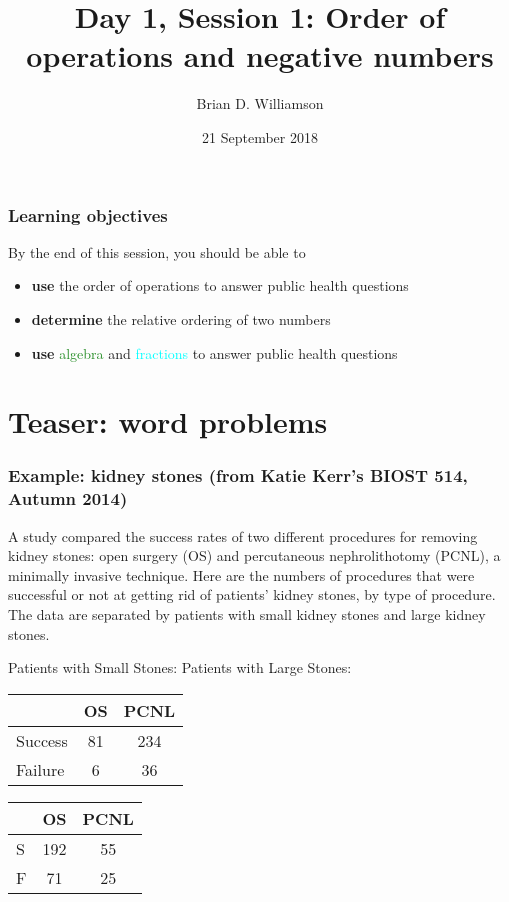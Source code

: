 \documentclass[11pt,dvipsnames]{beamer}
\title{Day 1, Session 1: Order of operations and negative numbers}
\author{Brian D. Williamson}
\institute{EPI/BIOST Bootcamp 2018}
\date{21 September 2018}
\newcommand{\myframe}[1]{\begin{frame} \frametitle{#1}}
\begin{document}
\begin{frame}
\titlepage
\end{frame}

\begin{frame}
\frametitle{Learning objectives}
By the end of this session, you should be able to
\begin{itemize}
\item \textbf{use} the order of operations to answer public health questions
\item \textbf{determine} the relative ordering of two numbers
\item \textbf{use} \textcolor{ForestGreen}{algebra} and \textcolor{cyan}{fractions} to answer public health questions
\end{itemize}
\end{frame}

\section{Teaser: word problems}
\myframe{Example: kidney stones \small(from Katie Kerr's BIOST 514, Autumn 2014)}
A study compared the success rates of two different procedures for removing kidney stones:  open surgery (OS) and percutaneous nephrolithotomy (PCNL), a minimally invasive technique.  Here are the numbers of procedures that were successful or not at getting rid of patients' kidney stones, by type of procedure.  The data are separated by patients with small kidney stones and large kidney stones.

{\scriptsize
\centering
Patients with Small Stones: \hspace{0.5cm} Patients with Large Stones: 

\hspace{1.3cm}
\begin{tabular}{lcc}
 & OS & PCNL \\
 \hline
 Success & 81 & 234 \\
 Failure & 6 & 36 \\
 \hline
\end{tabular}
\hspace{1cm}
\begin{tabular}{lcc}
 & OS & PCNL \\
 \hline
 S & 192 & 55 \\
 F & 71 & 25 \\
 \hline
\end{tabular}
}

\end{frame}
\end{document}
